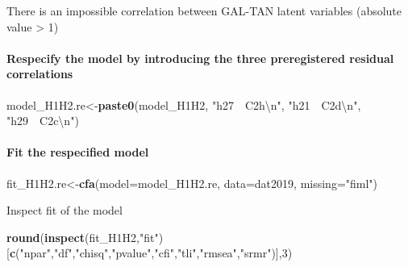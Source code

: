 \documentclass[
]{article}
\newenvironment{Shaded}{\begin{snugshade}}{\end{snugshade}}
\newcommand{\CharTok}[1]{\textcolor[rgb]{0.31,0.60,0.02}{#1}}
\newcommand{\DataTypeTok}[1]{\textcolor[rgb]{0.13,0.29,0.53}{#1}}
\newcommand{\DecValTok}[1]{\textcolor[rgb]{0.00,0.00,0.81}{#1}}
\newcommand{\KeywordTok}[1]{\textcolor[rgb]{0.13,0.29,0.53}{\textbf{#1}}}
\newcommand{\NormalTok}[1]{#1}
\newcommand{\StringTok}[1]{\textcolor[rgb]{0.31,0.60,0.02}{#1}}
\begin{document}
There is an impossible correlation between GAL-TAN latent variables
(absolute value \textgreater{} 1)

\newpage

\hypertarget{respecify-the-model-by-introducing-the-three-preregistered-residual-correlations}{%
\paragraph{Respecify the model by introducing the three preregistered
residual
correlations}\label{respecify-the-model-by-introducing-the-three-preregistered-residual-correlations}}

\begin{Shaded}
\begin{Highlighting}[]
\NormalTok{model_H1H2.re<-}\KeywordTok{paste0}\NormalTok{(model_H1H2,}
                      \StringTok{"h27~~C2h}\CharTok{\textbackslash{}n}\StringTok{"}\NormalTok{,}
                      \StringTok{"h21~~C2d}\CharTok{\textbackslash{}n}\StringTok{"}\NormalTok{,}
                      \StringTok{"h29~~C2c}\CharTok{\textbackslash{}n}\StringTok{"}\NormalTok{)}
\end{Highlighting}
\end{Shaded}

\hypertarget{fit-the-respecified-model}{%
\paragraph{Fit the respecified model}\label{fit-the-respecified-model}}

\begin{Shaded}
\begin{Highlighting}[]
\NormalTok{fit_H1H2.re<-}\KeywordTok{cfa}\NormalTok{(}\DataTypeTok{model=}\NormalTok{model_H1H2.re,}
              \DataTypeTok{data=}\NormalTok{dat2019,}
              \DataTypeTok{missing=}\StringTok{"fiml"}\NormalTok{)}
\end{Highlighting}
\end{Shaded}

Inspect fit of the model

\begin{Shaded}
\begin{Highlighting}[]
\KeywordTok{round}\NormalTok{(}\KeywordTok{inspect}\NormalTok{(fit_H1H2,}\StringTok{"fit"}\NormalTok{)}
\NormalTok{      [}\KeywordTok{c}\NormalTok{(}\StringTok{"npar"}\NormalTok{,}\StringTok{"df"}\NormalTok{,}\StringTok{"chisq"}\NormalTok{,}\StringTok{"pvalue"}\NormalTok{,}\StringTok{"cfi"}\NormalTok{,}\StringTok{"tli"}\NormalTok{,}\StringTok{"rmsea"}\NormalTok{,}\StringTok{"srmr"}\NormalTok{)],}\DecValTok{3}\NormalTok{)}
\end{Highlighting}
\end{Shaded}
\end{document}
